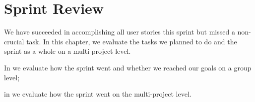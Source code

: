 \chapter{Sprint Review}\label{chap:sprint3_end}
We have succeeded in accomplishing all user stories this sprint but missed a non-crucial task. In this chapter, we evaluate the tasks we planned to do and the sprint as a whole on a multi-project level.

\begin{chapterorganization}
  \item In  we evaluate how the sprint went and whether we reached our goals on a group level;
  \item in  we evaluate how the sprint went on the multi-project level.
\end{chapterorganization}

